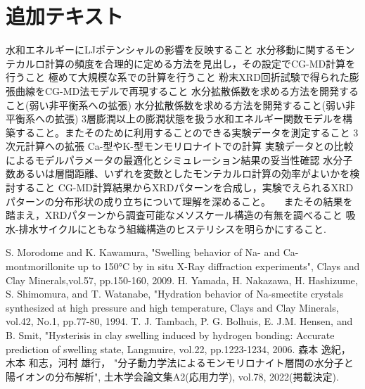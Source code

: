 ﻿\documentclass[11pt,a4j]{jarticle}
\begin{document}
\section{追加テキスト}
    水和エネルギーにLJポテンシャルの影響を反映すること
    水分移動に関するモンテカルロ計算の頻度を合理的に定める方法を見出し，その設定でCG-MD計算を行うこと
    極めて大規模な系での計算を行うこと
    粉末XRD回折試験で得られた膨張曲線をCG-MD法モデルで再現すること
    水分拡散係数を求める方法を開発すること(弱い非平衡系への拡張)
    水分拡散係数を求める方法を開発すること(弱い非平衡系への拡張)
    3層膨潤以上の膨潤状態を扱う水和エネルギー関数モデルを構築すること。またそのために利用することのできる実験データを測定すること
    3次元計算への拡張
    Ca-型やK-型モンモリロナイトでの計算
    実験データとの比較によるモデルパラメータの最適化とシミュレーション結果の妥当性確認
    水分子数あるいは層間距離、いずれを変数としたモンテカルロ計算の効率がよいかを検討すること
    CG-MD計算結果からXRDパターンを合成し，実験でえられるXRDパターンの分布形状の成り立ちについて理解を深めること。 　またその結果を踏まえ，XRDパターンから調査可能なメソスケール構造の有無を調べること
    吸水-排水サイクルにともなう組織構造のヒステリシスを明らかにすること.

\begin{thebibliography}{99}
	S. Morodome and K. Kawamura, 
	"Swelling behavior of Na- and Ca-montmorillonite up to 150°C by 
	in situ X-Ray diffraction experiments", 
	Clays and Clay Minerals,vol.57, pp.150-160, 2009.
	H. Yamada, H. Nakazawa, H. Hashizume, S. Shimomura, and T. Watanabe, 
	"Hydration behavior of Na-smectite crystals synthesized at high pressure 
	and high temperature, Clays and Clay Minerals, vol.42, No.1, pp.77-80, 1994.
	T. J. Tambach, P. G. Bolhuis, E. J.M. Hensen, and B. Smit, 
	"Hysterisis in clay swelling induced by hydrogen bonding: 
		Accurate prediction of swelling state, Langmuire, 
	vol.22, pp.1223-1234, 2006.
	森本 逸紀，木本 和志，河村 雄行，
	"分子動力学法によるモンモリロナイト層間の水分子と陽イオンの分布解析", 
		土木学会論文集A2(応用力学), vol.78, 2022(掲載決定). 	
\end{thebibliography}
\end{document}
